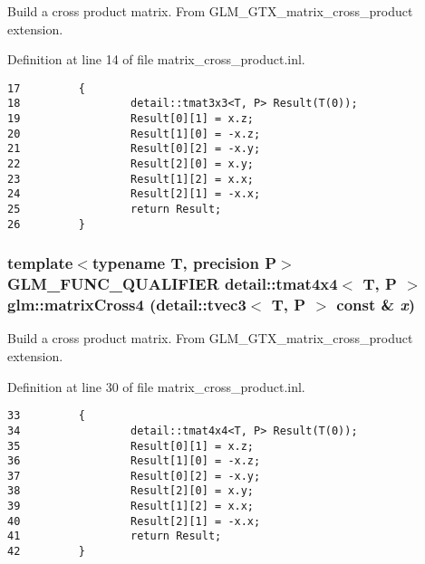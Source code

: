 Build a cross product matrix. From GLM\_\-GTX\_\-matrix\_\-cross\_\-product extension. 

Definition at line 14 of file matrix\_\-cross\_\-product.inl.

\begin{Code}\begin{verbatim}17         {
18                 detail::tmat3x3<T, P> Result(T(0));
19                 Result[0][1] = x.z;
20                 Result[1][0] = -x.z;
21                 Result[0][2] = -x.y;
22                 Result[2][0] = x.y;
23                 Result[1][2] = x.x;
24                 Result[2][1] = -x.x;
25                 return Result;
26         }
\end{verbatim}
\end{Code}


\hypertarget{group__gtx__matrix__cross__product_g9fae5322a4e4afe9742157f22b505635}{
\subsubsection[matrixCross4]{\setlength{\rightskip}{0pt plus 5cm}template$<$typename T, precision P$>$ GLM\_\-FUNC\_\-QUALIFIER detail::tmat4x4$<$ T, P $>$ glm::matrixCross4 (detail::tvec3$<$ T, P $>$ const \& {\em x})}}
\label{group__gtx__matrix__cross__product_g9fae5322a4e4afe9742157f22b505635}


Build a cross product matrix. From GLM\_\-GTX\_\-matrix\_\-cross\_\-product extension. 

Definition at line 30 of file matrix\_\-cross\_\-product.inl.

\begin{Code}\begin{verbatim}33         {
34                 detail::tmat4x4<T, P> Result(T(0));
35                 Result[0][1] = x.z;
36                 Result[1][0] = -x.z;
37                 Result[0][2] = -x.y;
38                 Result[2][0] = x.y;
39                 Result[1][2] = x.x;
40                 Result[2][1] = -x.x;
41                 return Result;
42         }
\end{verbatim}
\end{Code}


